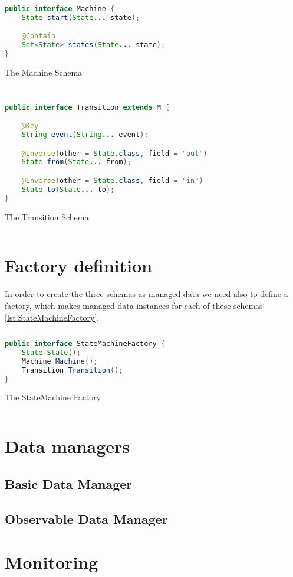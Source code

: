 \begin{sourcecode}
	\begin{lstlisting}[language=Java]
public interface Machine {
    State start(State... state);

    @Contain
    Set<State> states(State... state);
}
	\end{lstlisting}
	\caption{The Machine Schema}
	\label{lst:Machine_Schema}
\end{sourcecode}

\begin{sourcecode}
	\begin{lstlisting}[language=Java]
public interface Transition extends M {

    @Key
    String event(String... event);

    @Inverse(other = State.class, field = "out")
    State from(State... from);

    @Inverse(other = State.class, field = "in")
    State to(State... to);
}
	\end{lstlisting}
	\caption{The Transition Schema}
	\label{lst:Transition_Schema}
\end{sourcecode}

\section{Factory definition}
In order to create the three schemas as managed data we need also to define a factory, which makes managed data instances for each of these schemas \ref{lst:StateMachineFactory}.

\begin{sourcecode}
	\begin{lstlisting}[language=Java]
public interface StateMachineFactory {
    State State();
    Machine Machine();
    Transition Transition();
}
	\end{lstlisting}
	\caption{The StateMachine Factory}
	\label{lst:StateMachineFactory}
\end{sourcecode}

\section{Data managers}

\subsection{Basic Data Manager}

\subsection{Observable Data Manager}

\section{Monitoring}

